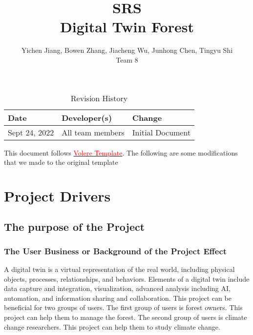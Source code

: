 \documentclass{article}
\title{SRS\\Digital Twin Forest}
\author{Yichen Jiang, Bowen Zhang, Jiacheng Wu, Junhong Chen, Tingyu Shi\\Team 8}
\begin{document}
\maketitle
\newpage
\begin{table}[htp]
\caption{Revision History} 
\begin{tabularx}{\textwidth}{llX}
\toprule
\textbf{Date} & \textbf{Developer(s)} & \textbf{Change}\\
\midrule
Sept 24, 2022 & All team members & Initial Document\\

\bottomrule
\end{tabularx}
\end{table}

\newpage

\noindent This document follows \href{https://www.cs.uic.edu/~i440/VolereMaterials/templateArchive16/c%20Volere%20template16.pdf}{\textcolor{red}{Volere Template}}.
The following are some modifications that we made to the 
original template


\newpage
\tableofcontents
\listoftables
\listoffigures
\cleardoublepage

\section{Project Drivers}
\subsection{The purpose of the Project}
\subsubsection{The User Business or Background of the Project Effect}
A digital twin is a virtual representation of the real world, including physical objects, 
processes, relationships, and behaviors. Elements of a digital twin include data capture
and integration, visualization, advanced analysis including AI, automation, and information
sharing and collaboration. This project can be beneficial for two groups of users.  The first
group of users is forest owners. This project can help them to manage the forest. The 
second group of users is climate change researchers. This project can help them to study
climate change.
\end{document}
